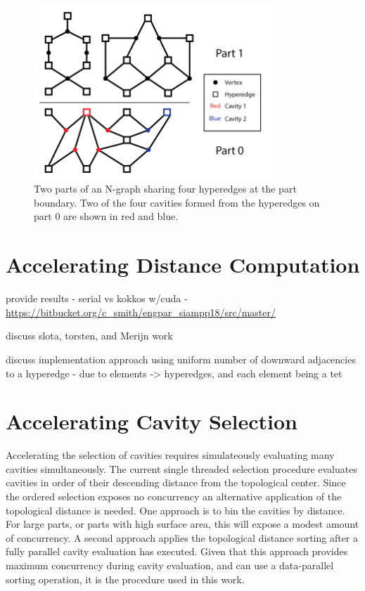 \documentclass[graybox]{svmult}
\begin{document}
\begin{figure}
  \label{fig:partBdry}
  \centering
  \includegraphics[width=0.8\textwidth]{images/PartBoundary.png}
  \caption{Two parts of an N-graph sharing four hyperedges at the part boundary.
    Two of the four cavities formed from the hyperedges on part 0 are shown in
    red and blue.
  }
\end{figure}

\section{Accelerating Distance Computation} \label{sec:dist}



provide results - serial vs kokkos w/cuda -
\url{https://bitbucket.org/c_smith/engpar_siampp18/src/master/}

discuss slota, torsten, and Merijn work

discuss implementation approach using uniform number of downward adjacencies to
a hyperedge - due to elements -> hyperedges, and each element being a tet

\section{Accelerating Cavity Selection} \label{sec:select}

Accelerating the selection of cavities requires simulateously evaluating many
cavities simultaneously.
The current single threaded selection procedure evaluates cavities in order of
their descending distance from the topological center.
Since the ordered selection exposes no concurrency an alternative application of
the topological distance is needed.
One approach is to bin the cavities by distance.
For large parts, or parts with high surface area, this will expose a modest
amount of concurrency.
A second approach applies the topological distance sorting after a fully
parallel cavity evaluation has executed.
Given that this approach provides maximum concurrency during cavity evaluation,
and can use a data-parallel sorting operation, it is the procedure used in this
work.
\end{document}
